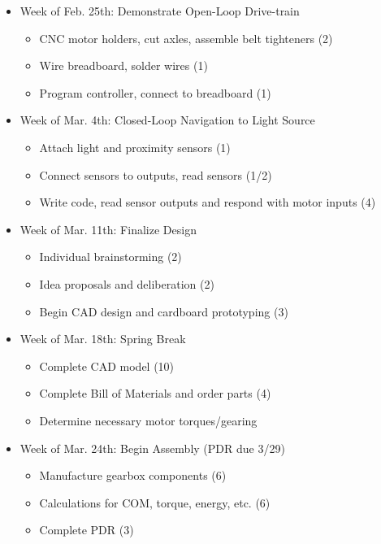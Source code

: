 \documentclass[12pt]{article}
\begin{document}
\begin{itemize} 
\item Week of Feb. 25th: Demonstrate Open-Loop Drive-train
\begin{itemize}
\item CNC motor holders, cut axles, assemble belt tighteners (2)
\item Wire breadboard, solder wires (1)
\item Program controller, connect to breadboard (1)
\end{itemize}
\end{itemize}
\begin{itemize}
\item Week of Mar. 4th: Closed-Loop Navigation to Light Source 
\begin{itemize}
\item Attach light and proximity sensors (1)
\item Connect sensors to outputs, read sensors (1/2)
\item Write code, read sensor outputs and respond with motor inputs (4)
\end{itemize}
\end{itemize}
\begin{itemize}
\item Week of Mar. 11th: Finalize Design 
\begin{itemize}
\item Individual brainstorming (2)
\item Idea proposals and deliberation (2)
\item Begin CAD design and cardboard prototyping (3)
\end{itemize}
\end{itemize}
\begin{itemize}
\item Week of Mar. 18th: Spring Break 
\begin{itemize}
\item Complete CAD model (10)
\item Complete Bill of Materials and order parts (4)
\item Determine necessary motor torques/gearing
\end{itemize}
\end{itemize}
\begin{itemize}
\item Week of Mar. 24th: Begin Assembly (PDR due 3/29)
\begin{itemize}
\item Manufacture gearbox components (6)
\item Calculations for COM, torque, energy, etc. (6)
\item Complete PDR (3)
\end{itemize}
\end{itemize}
\end{document}
